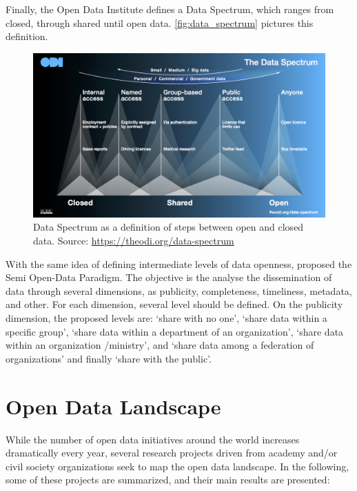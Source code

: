 Finally, the Open Data Institute defines a Data Spectrum, which ranges from closed, through shared until open data. \autoref{fig:data_spectrum} pictures this definition.

\begin{figure}[ht]
\begin{center}
\includegraphics[scale=0.3]{images/odi_open_data_spectrum.jpg}
\caption[Data Spectrum as a definition of steps between open and closed data.]{Data Spectrum as a definition of steps between open and closed data. Source: \url{https://theodi.org/data-spectrum}}
\label{fig:data_spectrum}
\end{center}
\end{figure}

With the same idea of defining intermediate levels of data openness,  proposed the Semi Open-Data Paradigm.
The objective is the analyse the dissemination of data through several dimensions, as publicity, completeness, timeliness, metadata, and other.
For each dimension, several level should be defined.
On the publicity dimension, the proposed levels are: ‘share with no one’, ‘share data within a specific group’, ‘share data within a department of an organization’, ‘share data within an organization /ministry’, and ‘share data among a federation of organizations’ and finally ‘share with the public’.

\section{Open Data Landscape}
\label{sec:opendatalandscape}

While the number of open data initiatives around the world increases dramatically every year, several research projects driven from academy and/or civil society organizations seek to map the open data landscape.
In the following, some of these projects are summarized, and their main results are presented:

